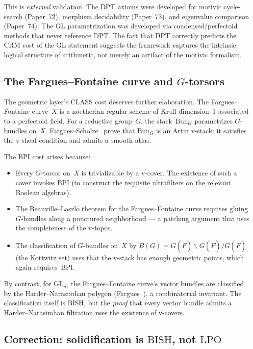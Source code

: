 \documentclass[12pt, a4paper]{article}
\theoremstyle{plain}
\theoremstyle{definition}
\theoremstyle{remark}
\newcommand{\BISH}{\mathrm{BISH}}
\newcommand{\LPO}{\mathrm{LPO}}
\newcommand{\CLASS}{\mathrm{CLASS}}
\newcommand{\BPI}{\mathrm{BPI}}
\begin{document}
This is \emph{external} validation.  The DPT axioms were developed
for motivic cycle-search (Paper~72), morphism decidability (Paper~73),
and eigenvalue comparison (Paper~74).  The GL parametrization was
developed via condensed/perfectoid methods that never reference DPT.
The fact that DPT correctly predicts the CRM cost of the GL statement
suggests the framework captures the intrinsic logical structure of
arithmetic, not merely an artifact of the motivic formalism.

\subsection{The Fargues--Fontaine curve and $G$-torsors}
\label{sec:ff-curve}

The geometric layer's $\CLASS$ cost deserves further elaboration.
The Fargues--Fontaine curve~$X$ is a noetherian regular scheme of
Krull dimension~1 associated to a perfectoid field.  For a reductive
group~$G$, the stack~$\mathrm{Bun}_G$ parametrizes $G$-bundles
on~$X$.  Fargues--Scholze~\cite{fargues-scholze} prove that
$\mathrm{Bun}_G$ is an Artin v-stack: it satisfies the v-sheaf
condition and admits a smooth atlas.

The $\BPI$ cost arises because:
\begin{itemize}
  \item Every $G$-torsor on~$X$ is trivializable by a v-cover.
    The existence of such a cover invokes $\BPI$ (to construct
    the requisite ultrafilters on the relevant Boolean algebras).
  \item The Beauville--Laszlo theorem for the Fargues--Fontaine
    curve requires gluing $G$-bundles along a punctured
    neighborhood --- a patching argument that uses the completeness
    of the v-topos.
  \item The classification of $G$-bundles on~$X$ by
    $B(G) = G(\breve{F}) \backslash G(\breve{F})/G(\breve{F})$
    (the Kottwitz set) uses that the v-stack has enough geometric
    points, which again requires~$\BPI$.
\end{itemize}

By contrast, for $\mathrm{GL}_n$, the Fargues--Fontaine curve's
vector bundles are classified by the Harder--Narasimhan polygon
(Fargues~\cite{fargues-scholze}), a combinatorial invariant.
The classification itself is $\BISH$, but the \emph{proof} that
every vector bundle admits a Harder--Narasimhan filtration uses
the existence of v-covers.

\subsection{Correction: solidification is $\BISH$, not $\LPO$}
\label{sec:correction}
\end{document}
